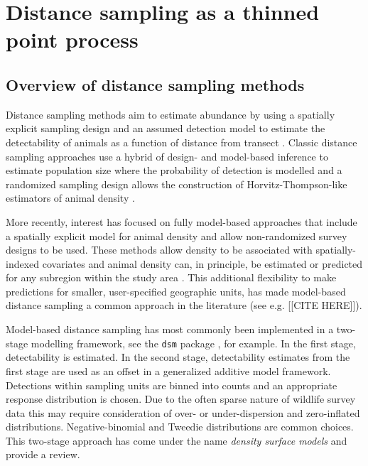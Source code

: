\documentclass[preprint,12pt]{elsarticle}
\begin{document}
\section{Distance sampling as a thinned point process}

\subsection{Overview of distance sampling methods}

Distance sampling methods aim to estimate abundance by using a spatially explicit sampling design and an assumed detection model to estimate the detectability of animals as a function of distance from transect \citep{buckland_advanced_2004, buckland_distance_2015}.  Classic distance sampling approaches use a hybrid of design- and model-based inference to estimate population size where the probability of detection is modelled and a randomized sampling design allows the construction of Horvitz-Thompson-like estimators of animal density \citep{horvitz_generalization_1952,  buckland_advanced_2004}.

More recently, interest has focused on fully model-based approaches that include a spatially explicit model for animal density and allow non-randomized survey designs to be used.  These methods allow density to be associated with spatially-indexed covariates and animal density can, in principle, be estimated or predicted for any subregion within the study area \citep{johnson_model-based_2010, miller_spatial_2013, buckland_model-based_2016}.  This additional flexibility to make predictions for smaller, user-specified geographic units, has made model-based distance sampling a common approach in the literature (see e.g. [[CITE HERE]]).

Model-based distance sampling has most commonly been implemented in a two-stage modelling framework, see the \texttt{dsm} package \citep{miller_spatial_2013}, for example.  In the first stage, detectability is estimated.  In the second stage, detectability estimates from the first stage are used as an offset in a generalized additive model framework.  Detections within sampling units are binned into counts and an appropriate response distribution is chosen.  Due to the often sparse nature of wildlife survey data this may require consideration of over- or under-dispersion and zero-inflated distributions.  Negative-binomial and Tweedie distributions are common choices.  This two-stage approach has come under the name \textit{density surface models} and \cite{miller_spatial_2013} provide a review.
\end{document}
